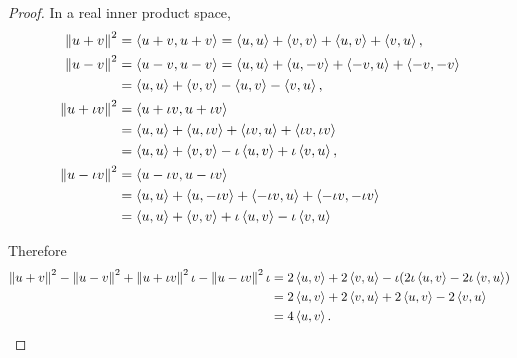 \begin{proof}
    In a real inner product space,
    \begin{align*}
        \left\Vert{u+v}\right\Vert^{2}         & = \left\langle{u + v, u + v}\right\rangle = \left\langle{u, u}\right\rangle + \left\langle{v, v}\right\rangle + \left\langle{u, v}\right\rangle + \left\langle{v, u}\right\rangle,    \\
        \left\Vert{u-v}\right\Vert^{2}         & = \left\langle{u - v, u - v}\right\rangle = \left\langle{u, u}\right\rangle + \left\langle{u, -v}\right\rangle + \left\langle{-v, u}\right\rangle + \left\langle{-v, -v}\right\rangle \\
                               & = \left\langle{u, u}\right\rangle + \left\langle{v, v}\right\rangle - \left\langle{u, v}\right\rangle - \left\langle{v, u}\right\rangle,                               \\
        \left\Vert{u + \iota v}\right\Vert^{2} & = \left\langle{u + \iota v, u + \iota v}\right\rangle                                                                     \\
                               & = \left\langle{u, u}\right\rangle + \left\langle{u, \iota v}\right\rangle + \left\langle{\iota v, u}\right\rangle + \left\langle{\iota v, \iota v}\right\rangle        \\
                               & = \left\langle{u, u}\right\rangle + \left\langle{v, v}\right\rangle - \iota\left\langle{u, v}\right\rangle + \iota\left\langle{v, u}\right\rangle,                     \\
        \left\Vert{u - \iota v}\right\Vert^{2} & = \left\langle{u - \iota v, u - \iota v}\right\rangle                                                                     \\
                               & = \left\langle{u, u}\right\rangle + \left\langle{u, -\iota v}\right\rangle + \left\langle{-\iota v, u}\right\rangle + \left\langle{-\iota v, -\iota v}\right\rangle    \\
                               & = \left\langle{u, u}\right\rangle + \left\langle{v, v}\right\rangle + \iota\left\langle{u, v}\right\rangle - \iota\left\langle{v, u}\right\rangle
    \end{align*}

    Therefore
    \begin{align*}
        \left\Vert{u + v}\right\Vert^{2} - \left\Vert{u - v}\right\Vert^{2} + \left\Vert{u + \iota v}\right\Vert^{2}\iota - \left\Vert{u - \iota v}\right\Vert^{2}\iota & = 2\left\langle{u, v}\right\rangle + 2\left\langle{v, u}\right\rangle - \iota (2\iota\left\langle{u, v}\right\rangle - 2\iota\left\langle{v, u}\right\rangle) \\
                                                                                                        & = 2\left\langle{u, v}\right\rangle + 2\left\langle{v, u}\right\rangle + 2\left\langle{u, v}\right\rangle - 2\left\langle{v, u}\right\rangle                   \\
                                                                                                        & = 4\left\langle{u, v}\right\rangle.\qedhere
    \end{align*}
\end{proof}
\newpage

